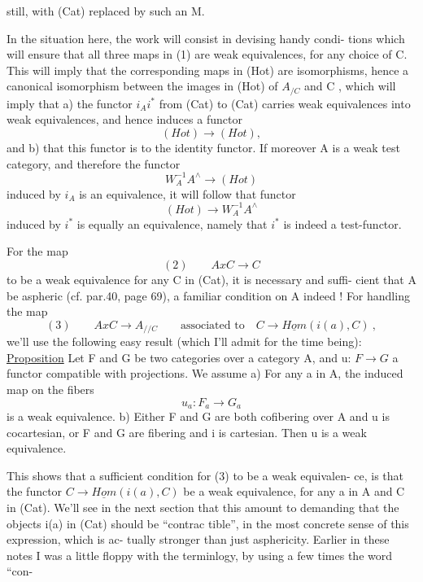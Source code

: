 
still, with (Cat) replaced by such an M.

In the situation here, the work will consist in devising handy condi-%
tions which will ensure that all three maps in (1) are weak equivalences,
for any choice of C. This will imply that the corresponding maps in (Hot)
are isomorphisms, hence a canonical isomorphism between the images in
(Hot) of $A_{/C}$ and C , which will imply that a) the functor $i_A i^*$ from
(Cat) to (Cat) carries weak equivalences into weak equivalences, and
hence induces a functor
\[ (Hot) \longrightarrow (Hot) , \]
and b) that this functor is  to the identity functor. If
moreover A is a weak test category, and therefore the functor
\[ W_A^{-1}A^{\wedge} \longrightarrow (Hot) \]
induced by $i_A$ is an equivalence, it will follow that \inserted[the]{} functor
\[ (Hot) \longrightarrow W_A^{-1}A^{\wedge} \]
induced by $i^*$ is equally an equivalence, namely that $i^*$ is indeed a
test-functor.

For the map
\[ (2) \qquad AxC \rightarrow C \]
to be a weak equivalence for any C in (Cat), it is necessary and suffi-%
cient that A be aspheric (cf. par.40, page 69), a familiar condition on
A indeed ! For handling the map
\[ (3) \qquad AxC \rightarrow A_{//C} \qquad \text{associated to} \quad C \rightarrow \underline{Hom}(i(a),C) \ , \]
we'll use the following easy result (which I'll admit for the time being):
\uline{Proposition} Let F and G be two  categories over a category A, and
u: $F \rightarrow G$ a functor compatible with projections. We assume
a) For any a in A, the induced map on the fibers
\[ u_a : F_a \rightarrow G_a \]
is a weak equivalence.
b) Either F and G are both cofibering over A and u is cocartesian,
or F and G are fibering and i is cartesian.
Then u is a weak equivalence.

This shows that a sufficient condition for (3) to be a weak equivalen-%
ce, is that the functor $C \rightarrow \underline{Hom}(i(a),C)$ be a weak equivalence, for
any a in A and C in (Cat). We'll see in the next section\hand{*} that this amount
to demanding that the  objects i(a) in (Cat) should be ``contrac%
tible'', in the most concrete sense of this  expression, which is ac-%
tually stronger than just asphericity. \hand{(}Earlier in these notes I was a 
little floppy with the terminlogy, by using a few times the word ``con-%

